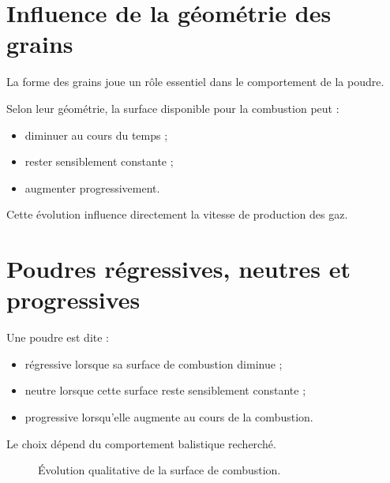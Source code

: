 \section{Influence de la géométrie des grains}

La forme des grains joue un rôle essentiel dans le comportement de la poudre.

Selon leur géométrie, la surface disponible pour la combustion peut :

\begin{itemize}
    \item diminuer au cours du temps ;
    \item rester sensiblement constante ;
    \item augmenter progressivement.
\end{itemize}

Cette évolution influence directement la vitesse de production des gaz.

\section{Poudres régressives, neutres et progressives}

Une poudre est dite :

\begin{itemize}
    \item régressive lorsque sa surface de combustion diminue ;
    \item neutre lorsque cette surface reste sensiblement constante ;
    \item progressive lorsqu'elle augmente au cours de la combustion.
\end{itemize}

Le choix dépend du comportement balistique recherché.

\begin{figure}[htbp]
\centering


\caption{Évolution qualitative de la surface de combustion.}
\label{fig:surface_combustion}

\end{figure}

